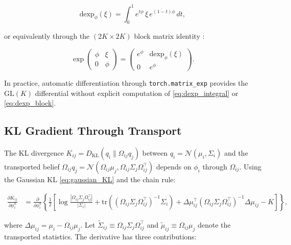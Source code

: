 \documentclass[twoside,11pt]{article}
\begin{document}
\begin{equation}
\mathrm{dexp}_\phi(\xi) = \int_0^1 e^{t\phi} \, \xi \, e^{(1-t)\phi} \, dt,
\label{eq:dexp_integral}
\end{equation}

or equivalently through the $(2K \times 2K)$ block matrix identity \citep{higham2008functions}:

\begin{equation}
\exp\!\begin{pmatrix} \phi & \xi \\ 0 & \phi \end{pmatrix}
= \begin{pmatrix} e^\phi & \mathrm{dexp}_\phi(\xi) \\ 0 & e^\phi \end{pmatrix}.
\label{eq:dexp_block}
\end{equation}

In practice, automatic differentiation through \texttt{torch.matrix\_exp} provides the $\mathrm{GL}(K)$ differential without explicit computation of \eqref{eq:dexp_integral} or \eqref{eq:dexp_block}.

\subsection{KL Gradient Through Transport}

The KL divergence $K_{ij} = D_{\mathrm{KL}}(q_i \| \Omega_{ij} q_j)$ between $q_i = \mathcal{N}(\mu_i, \Sigma_i)$ and the transported belief $\Omega_{ij} q_j = \mathcal{N}(\Omega_{ij}\mu_j, \Omega_{ij}\Sigma_j\Omega_{ij}^\top)$ depends on $\phi_i$ through $\Omega_{ij}$. Using the Gaussian KL \eqref{eq:gaussian_KL} and the chain rule:

\begin{align}
\frac{\partial K_{ij}}{\partial \phi_i^a}
&= \frac{\partial}{\partial \phi_i^a}\left\{
\frac{1}{2}\left[
\log\frac{|\Omega_{ij}\Sigma_j\Omega_{ij}^\top|}{|\Sigma_i|}
+ \mathrm{tr}\!\left((\Omega_{ij}\Sigma_j\Omega_{ij}^\top)^{-1}\Sigma_i\right)
+ \Delta\mu_{ij}^\top (\Omega_{ij}\Sigma_j\Omega_{ij}^\top)^{-1} \Delta\mu_{ij}
- K
\right]\right\},
\label{eq:dKL_dphi_expanded}
\end{align}

where $\Delta\mu_{ij} = \mu_i - \Omega_{ij}\mu_j$. Let $\tilde{\Sigma}_{ij} \equiv \Omega_{ij}\Sigma_j\Omega_{ij}^\top$ and $\tilde{\mu}_{ij} \equiv \Omega_{ij}\mu_j$ denote the transported statistics. The derivative has three contributions:
\end{document}
